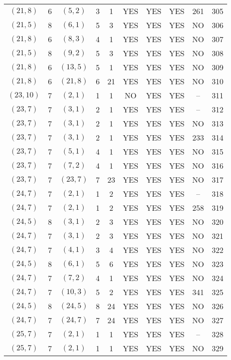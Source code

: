 \begin{longtable}{|c|c|c|c|c|c|c|c|c|c|}
$(21, 8)$ & 6 & $(5, 2)$ & 3 & 1 & YES & YES & YES & 261 & 305\\
$(21, 5)$ & 8 & $(6, 1)$ & 5 & 3 & YES & YES & YES & NO & 306\\
$(21, 8)$ & 6 & $(8, 3)$ & 4 & 1 & YES & YES & YES & NO & 307\\
$(21, 5)$ & 8 & $(9, 2)$ & 5 & 3 & YES & YES & YES & NO & 308\\
$(21, 8)$ & 6 & $(13, 5)$ & 5 & 1 & YES & YES & YES & NO & 309\\
$(21, 8)$ & 6 & $(21, 8)$ & 6 & 21 & YES & YES & YES & NO & 310\\
$(23, 10)$ & 7 & $(2, 1)$ & 1 & 1 & NO & YES & YES & -- & 311\\
$(23, 7)$ & 7 & $(3, 1)$ & 2 & 1 & YES & YES & YES & -- & 312\\
$(23, 7)$ & 7 & $(3, 1)$ & 2 & 1 & YES & YES & YES & NO & 313\\
$(23, 7)$ & 7 & $(3, 1)$ & 2 & 1 & YES & YES & YES & 233 & 314\\
$(23, 7)$ & 7 & $(5, 1)$ & 4 & 1 & YES & YES & YES & NO & 315\\
$(23, 7)$ & 7 & $(7, 2)$ & 4 & 1 & YES & YES & YES & NO & 316\\
$(23, 7)$ & 7 & $(23, 7)$ & 7 & 23 & YES & YES & YES & NO & 317\\
$(24, 7)$ & 7 & $(2, 1)$ & 1 & 2 & YES & YES & YES & -- & 318\\
$(24, 7)$ & 7 & $(2, 1)$ & 1 & 2 & YES & YES & YES & 258 & 319\\
$(24, 5)$ & 8 & $(3, 1)$ & 2 & 3 & YES & YES & YES & NO & 320\\
$(24, 7)$ & 7 & $(3, 1)$ & 2 & 3 & YES & YES & YES & NO & 321\\
$(24, 7)$ & 7 & $(4, 1)$ & 3 & 4 & YES & YES & YES & NO & 322\\
$(24, 5)$ & 8 & $(6, 1)$ & 5 & 6 & YES & YES & YES & NO & 323\\
$(24, 7)$ & 7 & $(7, 2)$ & 4 & 1 & YES & YES & YES & NO & 324\\
$(24, 7)$ & 7 & $(10, 3)$ & 5 & 2 & YES & YES & YES & 341 & 325\\
$(24, 5)$ & 8 & $(24, 5)$ & 8 & 24 & YES & YES & YES & NO & 326\\
$(24, 7)$ & 7 & $(24, 7)$ & 7 & 24 & YES & YES & YES & NO & 327\\
$(25, 7)$ & 7 & $(2, 1)$ & 1 & 1 & YES & YES & YES & -- & 328\\
$(25, 7)$ & 7 & $(2, 1)$ & 1 & 1 & YES & YES & YES & NO & 329\\

\end{longtable}
